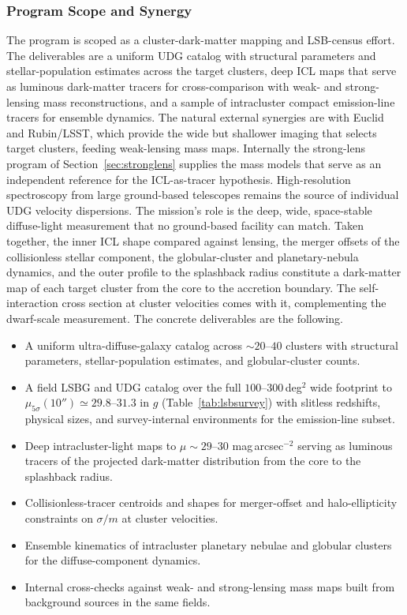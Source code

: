 \documentclass[10pt,onecolumn]{article}
\begin{document}
\subsubsection{Program Scope and Synergy}

The program is scoped as a cluster-dark-matter mapping and LSB-census effort. The deliverables are a uniform UDG catalog with structural parameters and stellar-population estimates across the target clusters, deep ICL maps that serve as luminous dark-matter tracers for cross-comparison with weak- and strong-lensing mass reconstructions, and a sample of intracluster compact emission-line tracers for ensemble dynamics. The natural external synergies are with Euclid and Rubin/LSST, which provide the wide but shallower imaging that selects target clusters, feeding weak-lensing mass maps. Internally the strong-lens program of Section~\ref{sec:stronglens} supplies the mass models that serve as an independent reference for the ICL-as-tracer hypothesis. High-resolution spectroscopy from large ground-based telescopes remains the source of individual UDG velocity dispersions. The mission's role is the deep, wide, space-stable diffuse-light measurement that no ground-based facility can match. Taken together, the inner ICL shape compared against lensing, the merger offsets of the collisionless stellar component, the globular-cluster and planetary-nebula dynamics, and the outer profile to the splashback radius constitute a dark-matter map of each target cluster from the core to the accretion boundary. The self-interaction cross section at cluster velocities comes with it, complementing the dwarf-scale measurement. The concrete deliverables are the following.
\begin{itemize}[leftmargin=1.4em,itemsep=1pt,topsep=2pt]
\item A uniform ultra-diffuse-galaxy catalog across $\sim20$--$40$ clusters with structural parameters, stellar-population estimates, and globular-cluster counts.
\item A field LSBG and UDG catalog over the full $100$--$300$\,deg$^2$ wide footprint to $\mu_{5\sigma}(10'')\simeq29.8$--$31.3$ in $g$ (Table~\ref{tab:lsbsurvey}) with slitless redshifts, physical sizes, and survey-internal environments for the emission-line subset.
\item Deep intracluster-light maps to $\mu\sim29$--$30$ mag\,arcsec$^{-2}$ serving as luminous tracers of the projected dark-matter distribution from the core to the splashback radius.
\item Collisionless-tracer centroids and shapes for merger-offset and halo-ellipticity constraints on $\sigma/m$ at cluster velocities.
\item Ensemble kinematics of intracluster planetary nebulae and globular clusters for the diffuse-component dynamics.
\item Internal cross-checks against weak- and strong-lensing mass maps built from background sources in the same fields.
\end{itemize}
\end{document}
